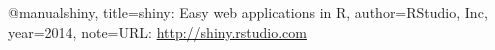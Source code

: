 
@manual{shiny, 
  title={shiny: Easy web applications in R}, 
  author={{RStudio, Inc}}, 
  year={2014}, 
  note={URL: \url{http://shiny.rstudio.com}} 
} 
